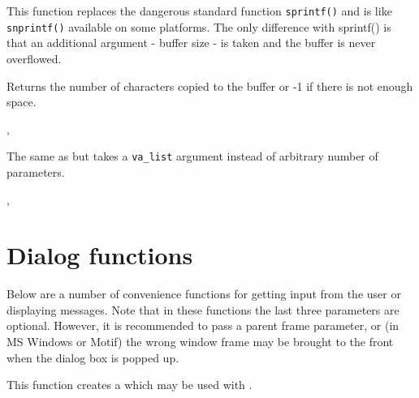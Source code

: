 
This function replaces the dangerous standard function {\tt sprintf()} and is
like {\tt snprintf()} available on some platforms. The only difference with
sprintf() is that an additional argument - buffer size - is taken and the
buffer is never overflowed.

Returns the number of characters copied to the buffer or -1 if there is not
enough space.


, 

\label{wxvsnprintf}


The same as  but takes a {\tt va\_list}
argument instead of arbitrary number of parameters.


, 

\section{Dialog functions}\label{dialogfunctions}

Below are a number of convenience functions for getting input from the
user or displaying messages. Note that in these functions the last three
parameters are optional. However, it is recommended to pass a parent frame
parameter, or (in MS Windows or Motif) the wrong window frame may be brought to
the front when the dialog box is popped up.

\label{wxcreatefiletipprovider}


This function creates a  which may be
used with .



